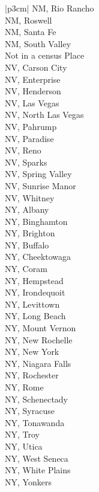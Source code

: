 \begin{customLongTable}{ |p{3cm}| }
NM, Rio Rancho \\ \hline
NM, Roswell \\ \hline
NM, Santa Fe \\ \hline
NM, South Valley \\ \hline
Not in a census Place \\ \hline
NV, Carson City \\ \hline
NV, Enterprise \\ \hline
NV, Henderson \\ \hline
NV, Las Vegas \\ \hline
NV, North Las Vegas \\ \hline
NV, Pahrump \\ \hline
NV, Paradise \\ \hline
NV, Reno \\ \hline
NV, Sparks \\ \hline
NV, Spring Valley \\ \hline
NV, Sunrise Manor \\ \hline
NV, Whitney \\ \hline
NY, Albany \\ \hline
NY, Binghamton \\ \hline
NY, Brighton \\ \hline
NY, Buffalo \\ \hline
NY, Cheektowaga \\ \hline
NY, Coram \\ \hline
NY, Hempstead \\ \hline
NY, Irondequoit \\ \hline
NY, Levittown \\ \hline
NY, Long Beach \\ \hline
NY, Mount Vernon \\ \hline
NY, New Rochelle \\ \hline
NY, New York \\ \hline
NY, Niagara Falls \\ \hline
NY, Rochester \\ \hline
NY, Rome \\ \hline
NY, Schenectady \\ \hline
NY, Syracuse \\ \hline
NY, Tonawanda \\ \hline
NY, Troy \\ \hline
NY, Utica \\ \hline
NY, West Seneca \\ \hline
NY, White Plains \\ \hline
NY, Yonkers \\ \hline

\end{customLongTable}
